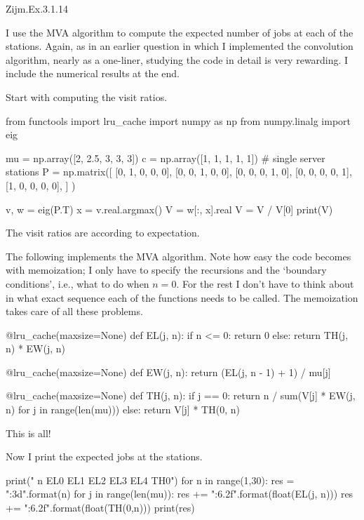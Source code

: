 \begin{exercise}
Zijm.Ex.3.1.14
\begin{solution}
  I use the MVA algorithm to compute the expected number of jobs at
  each of the stations. Again, as in an earlier question in which I
  implemented the convolution algorithm, nearly as a one-liner,
  studying the code in detail is very rewarding. I include the
  numerical results at the end.


 Start with computing the visit ratios.

\begin{pyconsole}
from functools import lru_cache
import numpy as np
from numpy.linalg import eig

mu = np.array([2, 2.5, 3, 3, 3])
c = np.array([1, 1, 1, 1, 1])  # single server stations
P = np.matrix([
    [0, 1, 0, 0, 0],
    [0, 0, 1, 0, 0],
    [0, 0, 0, 1, 0],
    [0, 0, 0, 0, 1],
    [1, 0, 0, 0, 0],
]
)

v, w = eig(P.T)
x = v.real.argmax()
V = w[:, x].real
V = V / V[0]
print(V)
  
\end{pyconsole}
The visit ratios are according to expectation.


The following implements the MVA algorithm. Note how easy the code becomes with
memoization; I only have to specify the recursions and the `boundary
conditions', i.e., what to do when $n=0$. For the rest I don't have to
think about in what exact sequence each of the functions needs to be
called. The memoization takes care of all these problems.

\begin{pyconsole}
@lru_cache(maxsize=None)
def EL(j, n):
    if n <= 0:
        return 0
    else:
        return TH(j, n) * EW(j, n)


@lru_cache(maxsize=None)
def EW(j, n):
    return (EL(j, n - 1) + 1) / mu[j]


@lru_cache(maxsize=None)
def TH(j, n):
    if j == 0:
        return n / sum(V[j] * EW(j, n) for j in range(len(mu)))
    else:
        return V[j] * TH(0, n)
  
\end{pyconsole}
This is all!


Now I print the expected jobs at the stations. 

\begin{pyconsole}
print("  n   EL0   EL1   EL2  EL3   EL4   TH0")
for n in range(1,30):
    res = "{:3d}".format(n)
    for j in range(len(mu)):
        res += "{:6.2f}".format(float(EL(j, n)))
    res += "{:6.2f}".format(float(TH(0,n)))
    print(res)
  

\end{pyconsole}
\end{solution}
\end{exercise}
